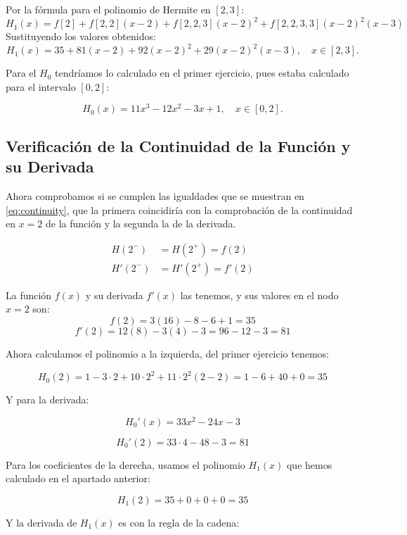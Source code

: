 \documentclass{article}
\begin{document}
Por la fórmula para el polinomio de Hermite en $[2,3]$:
\begin{equation}
H_1(x) = f[2] + f[2,2](x-2) + f[2,2,3](x-2)^2 + f[2,2,3,3](x-2)^2(x-3)
\end{equation}
Sustituyendo los valores obtenidos:
\begin{equation}
H_1(x) = 35 + 81(x-2) + 92(x-2)^2 + 29(x-2)^2(x-3), \quad x \in [2,3].
\end{equation}


Para el $H_0$ tendríamos lo calculado en el primer ejercicio, pues estaba calculado para el intervalo $[0,2]$:

$$ H_0(x) = 11x^3 - 12x^2 - 3x + 1, \quad x \in [0,2]. $$


\subsection{Verificación de la Continuidad de la Función y su Derivada}

Ahora comprobamos si se cumplen las igualdades que se muestran en \eqref{eq:continuity}, que la primera coincidiría con la comprobación de la continuidad en $x=2$ de la función y la segunda la de la derivada.

\begin{equation}
\label{eq:continuity}
\begin{aligned}
H(2^-) &= H(2^+) = f(2) \\
H'(2^-) &= H'(2^+) = f'(2)
\end{aligned}
\end{equation}

La función \(f(x)\) y su derivada \(f'(x)\) las tenemos, y sus valores en el nodo \(x=2\) son:
$$
f(2) = 3(16) - 8 - 6 + 1 = 35
$$
$$
f'(2) = 12(8) - 3(4) - 3 = 96 - 12 - 3 = 81
$$

Ahora calculamos el polinomio a la izquierda, del primer ejercicio tenemos:

$$
H_0(2) = 1 - 3 \cdot 2 + 10 \cdot 2^2 + 11 \cdot 2^2 (2-2) = 1 - 6 + 40 + 0 = 35
$$

Y para la derivada:

$$
H_0'(x)=33x^2-24x-3
$$

$$
H_0'(2)=33\cdot4-48-3=81
$$

Para los coeficientes de la derecha, usamos el polinomio \(H_1(x)\) que hemos calculado en el apartado anterior:

$$H_1(2) = 35+0+0+0 = 35$$

Y la derivada de \(H_1(x)\) es con la regla de la cadena:
\end{document}
